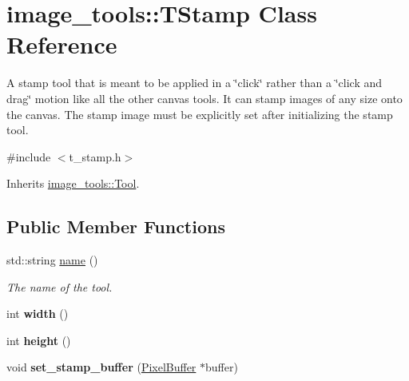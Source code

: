 \hypertarget{classimage__tools_1_1TStamp}{}\section{image\+\_\+tools\+:\+:T\+Stamp Class Reference}
\label{classimage__tools_1_1TStamp}


A stamp tool that is meant to be applied in a \char`\"{}click\char`\"{} rather than a \char`\"{}click and drag\char`\"{} motion like all the other canvas tools. It can stamp images of any size onto the canvas. The stamp image must be explicitly set after initializing the stamp tool.  




{\ttfamily \#include $<$t\+\_\+stamp.\+h$>$}



Inherits \hyperlink{classimage__tools_1_1Tool}{image\+\_\+tools\+::\+Tool}.

\subsection*{Public Member Functions}
\begin{DoxyCompactItemize}
\item 
std\+::string \hyperlink{classimage__tools_1_1TStamp_a1a1dec7161830a68bdaefbc0ec567855}{name} ()
\begin{DoxyCompactList}\small\item\em The name of the tool. \end{DoxyCompactList}\item 
int {\bfseries width} ()\hypertarget{classimage__tools_1_1TStamp_a8ca8765351ee8e42bd576cb360a51335}{}\label{classimage__tools_1_1TStamp_a8ca8765351ee8e42bd576cb360a51335}

\item 
int {\bfseries height} ()\hypertarget{classimage__tools_1_1TStamp_a553c39533c9fda20f0a1dcd2d4947ada}{}\label{classimage__tools_1_1TStamp_a553c39533c9fda20f0a1dcd2d4947ada}

\item 
void {\bfseries set\+\_\+stamp\+\_\+buffer} (\hyperlink{classimage__tools_1_1PixelBuffer}{Pixel\+Buffer} $\ast$buffer)\hypertarget{classimage__tools_1_1TStamp_a8c75d539609e224340895bf7e28a246b}{}\label{classimage__tools_1_1TStamp_a8c75d539609e224340895bf7e28a246b}

\end{DoxyCompactItemize}
